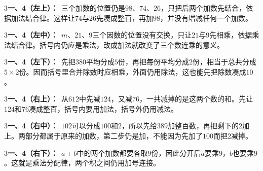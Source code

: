 \documentclass[multi=snippet,border={5bp 20bp 5bp 5bp}]{standalone}
\newenvironment{snippet}[3]{\begin{minipage}{#1bp}\color{answerred}\fontsize{#2}{#3}\selectfont\raggedright}{\end{minipage}}
\begin{document}
\begin{snippet}{505}{11.5}{14}\begin{multicols}{3}\raggedcolumns \textbf{一、4（左上）：}\ 三个加数的位置仍是\(98\)\allowbreak 、\(74\)\allowbreak 、\(26\)\allowbreak ，只把后两个加数先结合，依据加法结合律。这样让\(74\)\allowbreak 与\(26\)\allowbreak 先凑成整百，再加\(98\)\allowbreak ，并没有增减任何一个加数。\end{multicols}\end{snippet}
\begin{snippet}{505}{11.5}{14}\begin{multicols}{3}\raggedcolumns \textbf{一、4（左中）：}\ \(m\)\allowbreak 、\(21\)\allowbreak 、\(9\)\allowbreak 三个因数的位置没有交换，只让\(21\)\allowbreak 与\(9\)\allowbreak 先相乘，依据乘法结合律。括号内仍应是乘法，改成加法就改变了三个数连乘的意义。\end{multicols}\end{snippet}
\begin{snippet}{505}{11.5}{14}\begin{multicols}{3}\raggedcolumns \textbf{一、4（左下）：}\ 先把\(380\)\allowbreak 平均分成\(5\)\allowbreak 份，再把每份平均分成\(2\)\allowbreak 份，相当于总共分成\(5\times2\)\allowbreak 份。因而括号里合并除数时应相乘，外面仍用除法，这也能先把除数凑成\(10\)\allowbreak 。\end{multicols}\end{snippet}
\begin{snippet}{505}{11.5}{14}\begin{multicols}{3}\raggedcolumns \textbf{一、4（右上）：}\ 从\(612\)\allowbreak 中先减\(124\)\allowbreak ，又减\(76\)\allowbreak ，一共减掉的是这两个数的和。先让\(124\)\allowbreak 和\(76\)\allowbreak 凑成整百，括号内要用加法，括号外仍用减法。\end{multicols}\end{snippet}
\begin{snippet}{505}{11.5}{14}\begin{multicols}{3}\raggedcolumns \textbf{一、4（右中）：}\ \(102\)\allowbreak 可以分成\(100\)\allowbreak 和\(2\)\allowbreak ，所以先给\(389\)\allowbreak 加整百数，再把剩下的\(2\)\allowbreak 加上。两部分都属于原来的加数，第二步仍是加，不能因为先加了\(100\)\allowbreak 而把\(2\)\allowbreak 减掉。\end{multicols}\end{snippet}
\begin{snippet}{505}{11.5}{14}\begin{multicols}{3}\raggedcolumns \textbf{一、4（右下）：}\ \(a+b\)\allowbreak 中的两个加数都要各取\(9\)\allowbreak 份，因此分开后\(a\)\allowbreak 要乘\(9\)\allowbreak ，\(b\)\allowbreak 也要乘\(9\)\allowbreak 。这就是乘法分配律，两个积之间仍用加号连接。\end{multicols}\end{snippet}
\end{document}
